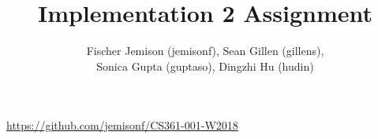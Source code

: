 \documentclass[12pt]{article}
\title{Implementation 2 Assignment}
\author{Fischer Jemison (jemisonf), Sean Gillen (gillens), \\
Sonica Gupta (guptaso), Dingzhi Hu (hudin) }
\begin{document}
\maketitle
\centerline{\url{https://github.com/jemisonf/CS361-001-W2018}}
\tableofcontents







\end{document}
